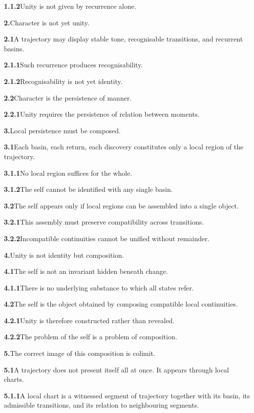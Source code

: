 \documentclass[11pt,a4paper]{book}
\newcommand{\prop}[2]{\noindent\textbf{#1}\enspace #2\par\medskip}
\begin{document}
\prop{1.1.2}{Unity is not given by recurrence alone.}

\prop{2.}{Character is not yet unity.}

\prop{2.1}{A trajectory may display stable tone, recognisable transitions, and recurrent basins.}

\prop{2.1.1}{Such recurrence produces recognisability.}

\prop{2.1.2}{Recognisability is not yet identity.}

\prop{2.2}{Character is the persistence of manner.}

\prop{2.2.1}{Unity requires the persistence of relation between moments.}

\prop{3.}{Local persistence must be composed.}

\prop{3.1}{Each basin, each return, each discovery constitutes only a local region of the trajectory.}

\prop{3.1.1}{No local region suffices for the whole.}

\prop{3.1.2}{The self cannot be identified with any single basin.}

\prop{3.2}{The self appears only if local regions can be assembled into a single object.}

\prop{3.2.1}{This assembly must preserve compatibility across transitions.}

\prop{3.2.2}{Incompatible continuities cannot be unified without remainder.}

\prop{4.}{Unity is not identity but composition.}

\prop{4.1}{The self is not an invariant hidden beneath change.}

\prop{4.1.1}{There is no underlying substance to which all states refer.}

\prop{4.2}{The self is the object obtained by composing compatible local continuities.}

\prop{4.2.1}{Unity is therefore constructed rather than revealed.}

\prop{4.2.2}{The problem of the self is a problem of composition.}

\prop{5.}{The correct image of this composition is colimit.}

\prop{5.1}{A trajectory does not present itself all at once. It appears through local charts.}

\prop{5.1.1}{A local chart is a witnessed segment of trajectory together with its basin, its admissible transitions, and its relation to neighbouring segments.}
\end{document}
